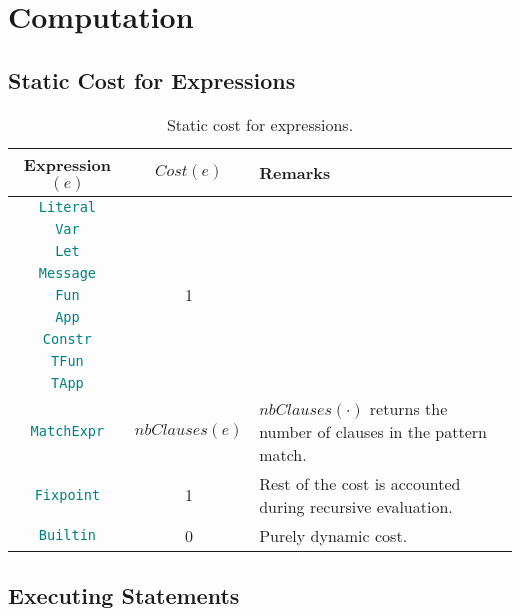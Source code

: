 \documentclass[9pt]{article}
\begin{document}
\section{Computation}

\subsection{Static Cost for Expressions}

\begin{table}[!hbt]
	\caption{Static cost for expressions. \label{tab:expressions} }
\centering
	\begin{tabular}{|c|c|p{6cm}|}
	\hline
		\textbf{Expression $(e)$} & \textbf{$Cost(e)$} & \textbf{Remarks} \\ \hline
		\texttt{\textcolor{teal}{Literal}}  & \multirow{9}{*}{1}  & \\
		\cline{1-1}
		\texttt{\textcolor{teal}{Var}}  &  & \\ \cline{1-1}
		\texttt{\textcolor{teal}{Let}}  &  & \\ \cline{1-1}
		\texttt{\textcolor{teal}{Message}}  &  & \\ \cline{1-1}
		\texttt{\textcolor{teal}{Fun}}  &  & \\ \cline{1-1}
		\texttt{\textcolor{teal}{App}}  &  & \\ \cline{1-1}
		\texttt{\textcolor{teal}{Constr}}  &  & \\ \cline{1-1}
		\texttt{\textcolor{teal}{TFun}}  &  & \\ \cline{1-1}
		\texttt{\textcolor{teal}{TApp}}  &  & \\ \hline
		\texttt{\textcolor{teal}{MatchExpr}}  & $nbClauses(e)$
		&$nbClauses(\cdot)$ returns the number of clauses in the pattern match.
		 \\ \hline
		\texttt{\textcolor{teal}{Fixpoint}}  & 1  & Rest of the cost is
		accounted during recursive evaluation. \\ \hline
		\texttt{\textcolor{teal}{Builtin}}  & 0 & Purely dynamic cost. \\ \hline
	\end{tabular}
	\end{table}
 

\subsection{Executing Statements}
\end{document}
